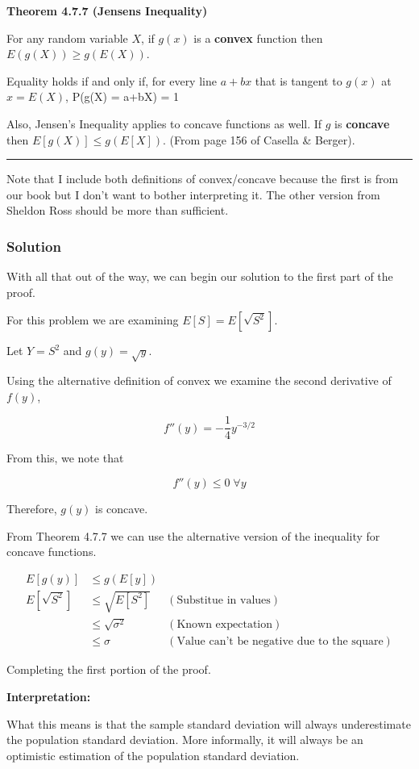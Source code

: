 \noindent\textbf{Theorem 4.7.7 (Jensens Inequality)}

For any random variable $X$, if $g(x)$ is a \textbf{convex} function then $E(g(X)) \geq g(E(X))$.

Equality holds if and only if, for every line $a + bx$ that is tangent to $g(x)$ at $x = E(X)$, P(g(X) = a+bX) = 1

Also, Jensen's Inequality applies to concave functions as well. If $g$ is \textbf{concave} then $E[g(X)] \leq g(E[X])$. (From page 156 of Casella \& Berger). 
\vspace{0.75em}
\hrule
\vspace{0.75em}

Note that I include both definitions of convex/concave because the first is from our book but I don't want to bother interpreting it. The other version from Sheldon Ross should be more than sufficient.

\pagebreak

\subsubsection*{Solution}

With all that out of the way, we can begin our solution to the first part of the proof. 

For this problem we are examining $E[S] = E[\sqrt{S^2}]$. 

Let $Y=S^2$ and $g(y) = \sqrt{y}$. 

Using the alternative definition of convex we examine the second derivative of $f(y)$, 

\[f''(y) = -\frac{1}{4} y^{-3/2}\]

From this, we note that

\[f''(y) \leq 0 \; \forall y\] 

Therefore, $g(y)$ is concave.

From Theorem 4.7.7 we can use the alternative version of the inequality for concave functions.

\begin{align*}
	E[g(y)] &\leq g(E[y]) \\
	E[\sqrt{S^2}] &\leq \sqrt{E[S^2]} & (\text{Substitue in values}) \\
	&\leq \sqrt{\sigma^2} & (\text{Known expectation}) \\
	&\leq \sigma & (\text{Value can't be negative due to the square})
\end{align*}

Completing the first portion of the proof.

\noindent\textbf{Interpretation:}

What this means is that the sample standard deviation will always underestimate the population standard deviation. More informally, it will always be an optimistic estimation of the population standard deviation.
